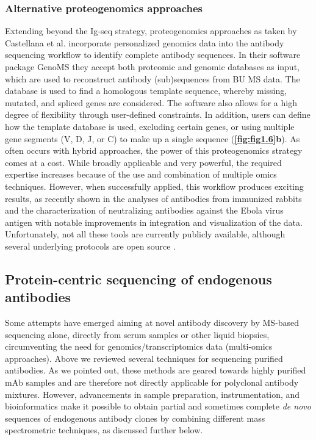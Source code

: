 \subsubsection{Alternative proteogenomics approaches}
Extending beyond the Ig-seq strategy, proteogenomics approaches as taken by Castellana et al. \cite{castellana2010template} incorporate personalized genomics data into the antibody sequencing workflow to identify complete antibody sequences. In their software package GenoMS \cite{castellana2010template} they accept both proteomic and genomic databases as input, which are used to reconstruct antibody (sub)sequences from BU MS data. The database is used to find a homologous template sequence, whereby missing, mutated, and spliced genes are considered. The software also allows for a high degree of flexibility through user-defined constraints. In addition, users can define how the template database is used, excluding certain genes, or using multiple gene segments (V, D, J, or C) to make up a single sequence (\textbf{\autoref{fig:fig1.6}b}). As often occurs with hybrid approaches, the power of this proteogenomics strategy comes at a cost. While broadly applicable and very powerful, the required expertise increases because of the use and combination of multiple omics techniques. However, when successfully applied, this workflow produces exciting results, as recently shown in the analyses of antibodies from immunized rabbits \cite{bonissone2020serum} and the characterization of neutralizing antibodies against the Ebola virus antigen \cite{gilchuk2021proteo-genomic} with notable improvements in integration and visualization of the data. Unfortunately, not all these tools are currently publicly available, although several underlying protocols are open source \cite{cha2017antibody, safonova2015igrepertoireconstructor:, bonissone2016immunoglobulin}.

\subsection{Protein-centric sequencing of endogenous antibodies}
Some attempts have emerged aiming at novel antibody discovery by MS-based sequencing alone, directly from serum samples or other liquid biopsies, circumventing the need for genomics/transcriptomics data (multi-omics approaches). Above we reviewed several techniques for sequencing purified antibodies. As we pointed out, these methods are geared towards highly purified mAb samples and are therefore not directly applicable for polyclonal antibody mixtures. However, advancements in sample preparation, instrumentation, and bioinformatics make it possible to obtain partial and sometimes complete \emph{de novo} sequences of endogenous antibody clones by combining different mass spectrometric techniques, as discussed further below.

